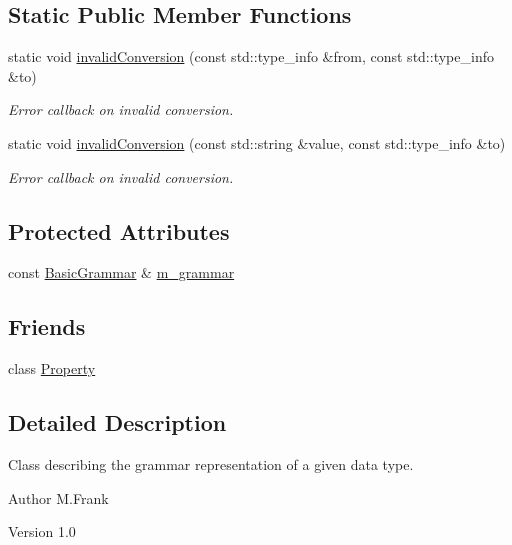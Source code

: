 \subsection*{Static Public Member Functions}
\begin{DoxyCompactItemize}
\item 
static void \hyperlink{class_d_d4hep_1_1_property_grammar_ac36bdd6df04d3f26daff768377e1583a}{invalidConversion} (const std::type\_\-info \&from, const std::type\_\-info \&to)
\begin{DoxyCompactList}\small\item\em Error callback on invalid conversion. \item\end{DoxyCompactList}\item 
static void \hyperlink{class_d_d4hep_1_1_property_grammar_af0a4553e93979108dd872da16091e206}{invalidConversion} (const std::string \&value, const std::type\_\-info \&to)
\begin{DoxyCompactList}\small\item\em Error callback on invalid conversion. \item\end{DoxyCompactList}\end{DoxyCompactItemize}
\subsection*{Protected Attributes}
\begin{DoxyCompactItemize}
\item 
const \hyperlink{class_d_d4hep_1_1_basic_grammar}{BasicGrammar} \& \hyperlink{class_d_d4hep_1_1_property_grammar_a49c47d61452e560f0186eef943cf711e}{m\_\-grammar}
\end{DoxyCompactItemize}
\subsection*{Friends}
\begin{DoxyCompactItemize}
\item 
class \hyperlink{class_d_d4hep_1_1_property_grammar_a386f5a9cf65610cb62143865e5637272}{Property}
\end{DoxyCompactItemize}


\subsection{Detailed Description}
Class describing the grammar representation of a given data type. \begin{DoxyAuthor}{Author}
M.Frank 
\end{DoxyAuthor}
\begin{DoxyVersion}{Version}
1.0 
\end{DoxyVersion}


